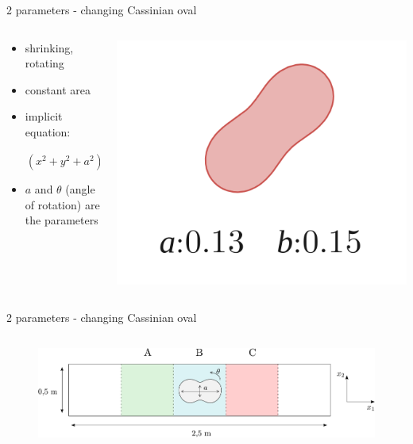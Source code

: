 \documentclass[aspectratio=169,xcolor=dvipsnames]{beamer}
\begin{document}
\begin{frame}{2 parameters - changing Cassinian oval}
	\begin{columns}
		\begin{column}{.6\textwidth}
			\begin{itemize}
				\setlength\itemsep{1.4em}
				\item shrinking, rotating
				\item constant area
				\item implicit equation:
			\end{itemize}		
			\vspace{4mm}
			$$ \ \ \ \ \ \ \ \ \left( x^{2}+ y^{2}+a^{2} \right)^{2}-4 x ^{2} a^{2}-b^{4} = 0 $$
			\vspace{-3mm}
			\begin{itemize}
				\item $ a $ and $ \theta $ (angle of rotation) are the parameters
			\end{itemize}	
		\end{column}
		\begin{column}{.4\textwidth}
			\includegraphics[width=0.9\linewidth, trim={0 0 0 0}, clip]{Images/a3.png}			
		\end{column}
	\end{columns}	
\end{frame}
\begin{frame}{2 parameters - changing Cassinian oval}
	\addtocounter{framenumber}{-1}
	\begin{columns}
		\begin{column}{1\textwidth}
			\begin{figure}
				\includegraphics[width=1\linewidth, trim={0 0 0 0}, clip]{Images/cassini.pdf}		
			\end{figure}
		\end{column}
	\end{columns}	
\end{frame}
\end{document}
